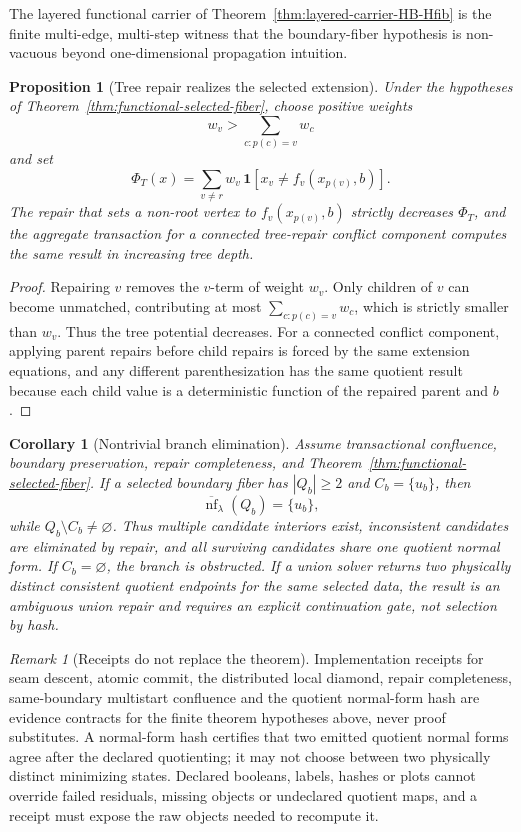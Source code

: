 \documentclass[11pt]{article}
\newtheorem{corollary}[theorem]{Corollary}
\newtheorem{proposition}[theorem]{Proposition}
\theoremstyle{remark}
\newtheorem{remark}[theorem]{Remark}
\theoremstyle{plain}
\begin{document}
The layered functional carrier of Theorem~\ref{thm:layered-carrier-HB-Hfib} is the finite
multi-edge, multi-step witness that the boundary-fiber hypothesis is non-vacuous beyond
one-dimensional propagation intuition.

\begin{proposition}[Tree repair realizes the selected extension]\label{prop:tree-selected-descent}
Under the hypotheses of Theorem~\ref{thm:functional-selected-fiber}, choose positive weights
\[
w_v>\sum_{c:p(c)=v}w_c
\]
and set
\[
\Phi_T(x)=\sum_{v\ne r}w_v\,\mathbf 1[x_v\ne f_v(x_{p(v)},b)] .
\]
The repair that sets a non-root vertex to \(f_v(x_{p(v)},b)\) strictly decreases \(\Phi_T\), and
the aggregate transaction for a connected tree-repair conflict component computes the same result
in increasing tree depth.
\end{proposition}

\begin{proof}
Repairing \(v\) removes the \(v\)-term of weight \(w_v\). Only children of \(v\) can become
unmatched, contributing at most \(\sum_{c:p(c)=v}w_c\), which is strictly smaller than \(w_v\).
Thus the tree potential decreases. For a connected conflict component, applying parent repairs
before child repairs is forced by the same extension equations, and any different
parenthesization has the same quotient result because each child value is a deterministic function
of the repaired parent and \(b\).
\end{proof}

\begin{corollary}[Nontrivial branch elimination]\label{cor:branch-elimination}
Assume transactional confluence, boundary preservation, repair completeness, and
Theorem~\ref{thm:functional-selected-fiber}. If a selected boundary fiber has \(|Q_b|\ge2\) and
\(C_b=\{u_b\}\), then
\[
\overline{\operatorname{nf}}_\lambda(Q_b)=\{u_b\},
\]
while \(Q_b\setminus C_b\ne\varnothing\). Thus multiple candidate interiors exist, inconsistent
candidates are eliminated by repair, and all surviving candidates share one quotient normal form.
If \(C_b=\varnothing\), the branch is obstructed. If a union solver returns two physically
distinct consistent quotient endpoints for the same selected data, the result is an
ambiguous union repair and requires an explicit continuation gate, not selection by hash.
\end{corollary}

\begin{remark}[Receipts do not replace the theorem]\label{rem:receipt-boundary}
Implementation receipts for seam descent, atomic commit, the distributed
local diamond, repair completeness, same-boundary multistart confluence and
the quotient normal-form hash are evidence contracts for the finite theorem
hypotheses above, never proof substitutes. A normal-form hash certifies that
two emitted quotient normal forms agree after the declared quotienting; it
may not choose between two physically distinct minimizing states. Declared
booleans, labels, hashes or plots cannot override failed residuals, missing
objects or undeclared quotient maps, and a receipt must expose the raw
objects needed to recompute it.
\end{remark}
\end{document}
